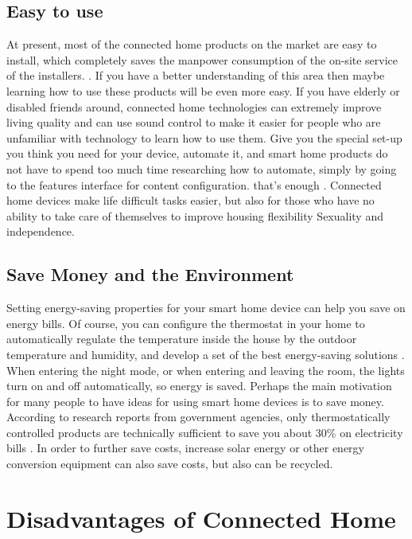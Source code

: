 \documentclass[report]{IEEEtran}
\begin{document}
\subsection{Easy to use}
At present, most of the connected home products on the market are easy to install, which completely saves the manpower consumption of the on-site service of the installers. \cite{4}. If you have a better understanding of this area then maybe learning how to use these products will be even more easy. If you have elderly or disabled friends around, connected home technologies can extremely improve living quality and can use sound control to make it easier for people who are unfamiliar with technology to learn how to use them. Give you the special set-up you think you need for your device, automate it, and smart home products do not have to spend too much time researching how to automate, simply by going to the features interface for content configuration. that's enough \cite{7}. Connected home devices make life difficult tasks easier, but also for those who have no ability to take care of themselves to improve housing flexibility Sexuality and independence.
\subsection{Save Money and the Environment}
Setting energy-saving properties for your smart home device can help you save on energy bills. Of course, you can configure the thermostat in your home to automatically regulate the temperature inside the house by the outdoor temperature and humidity, and develop a set of the best energy-saving solutions \cite{6}. When entering the night mode, or when entering and leaving the room, the lights turn on and off automatically, so energy is saved. Perhaps the main motivation for many people to have ideas for using smart home devices is to save money. According to research reports from government agencies, only thermostatically controlled products are technically sufficient to save you about 30\% on electricity bills \cite{7}. In order to further save costs, increase solar energy or other energy conversion equipment can also save costs, but also can be recycled.


\section{Disadvantages of Connected Home}
\end{document}
